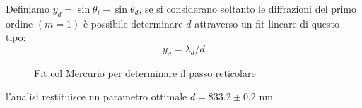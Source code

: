 \documentclass[10pt,a4paper]{article}
\begin{document}
	    Definiamo $y_d=\sin\theta_{i} - \sin\theta_{d}$, se si considerano soltanto le diffrazioni del primo ordine $(m=1)$ è possibile determinare $d$ attraverso un fit lineare di questo tipo:
	    \begin{equation}
	    	y_d=\lambda_d/d
	    \end{equation}
	    \begin{figure}[H]
	    	\centering
		    \quad
		    \caption{Fit col Mercurio per determinare il passo reticolare}
	    \end{figure}
	    l'analisi restituisce un parametro ottimale $d = 833.2\pm0.2$ nm
\end{document}
